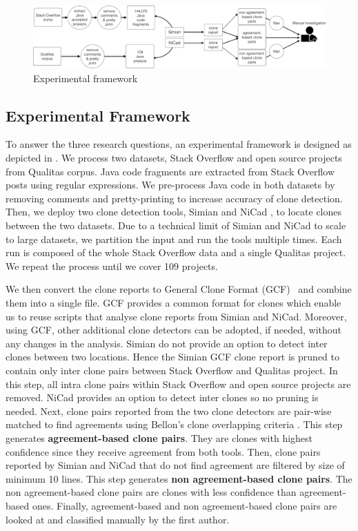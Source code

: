 \documentclass{sig-alternate-05-2015}
\begin{document}
\begin{figure}
	\centering
	\includegraphics[width=0.9\linewidth]{exp_framework}
	\caption{Experimental framework}
	\label{fig:exp_framework}
\end{figure}

\subsection{Experimental Framework}
To answer the three research questions, an experimental framework is designed as depicted in . We process two datasets, Stack Overflow and open source projects from Qualitas corpus. Java code fragments are extracted from Stack Overflow posts using regular expressions. We pre-process Java code in both datasets by removing comments and pretty-printing to increase accuracy of clone detection. Then, we deploy two clone detection tools, Simian \cite{simian} and NiCad \cite{Roy2008,Cordy}, to locate clones between the two datasets. Due to a technical limit of Simian and NiCad to scale to large datasets, we partition the input and run the tools multiple times. Each run is composed of the whole Stack Overflow data and a single Qualitas project. We repeat the process until we cover 109 projects. 

We then convert the clone reports to General Clone Format (GCF)~\cite{Wang2013} and combine them into a single file. GCF provides a common format for clones which enable us to reuse scripts that analyse clone reports from Simian and NiCad. Moreover, using GCF, other additional clone detectors can be adopted, if needed, without any changes in the analysis. Simian do not provide an option to detect inter clones between two locations. Hence the Simian GCF clone report is pruned to contain only inter clone pairs between Stack Overflow and Qualitas project. In this step, all intra clone pairs within Stack Overflow and open source projects are removed. NiCad provides an option to detect inter clones so no pruning is needed. Next, clone pairs reported from the two clone detectors are pair-wise matched to find agreements using Bellon's clone overlapping criteria \cite{Bellon2007}. This step generates \textbf{agreement-based clone pairs}. They are clones with highest confidence since they receive agreement from both tools. Then, clone pairs reported by Simian and NiCad that do not find agreement are filtered by size of minimum 10 lines. This step generates \textbf{non agreement-based clone pairs}. The non agreement-based clone pairs are clones with less confidence than agreement-based ones. Finally, agreement-based and non agreement-based clone pairs are looked at and classified manually by the first author.
\end{document}
